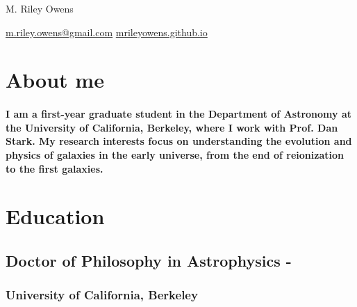 \documentclass[11pt]{article}
\newif\ifRemVS %
\newcommand{\rvs}{
    \ifRemVS
        \vspace{-1.5ex}
    \fi
    \global\RemVSfalse
}
\begin{document}
\begin{center}      
    {\fontsize{28}{28}\selectfont M. Riley Owens} \\ \bigskip

    {\color{icnclr}\faEnvelope[solid]} \href{mailto:m.riley.owens@gmail.com}{m.riley.owens@gmail.com} \quad
    {\color{icnclr}\faGlobe[regular]} \href{https://mrileyowens.github.io}{mrileyowens.github.io}
\end{center}

\section{About me}

\paragraph{
I am a first-year graduate student in the Department of Astronomy at the University of California, Berkeley, where I work with Prof. Dan Stark. My research interests focus on understanding the evolution and physics of galaxies in the early universe, from the end of reionization to the first galaxies.
}
\vspace{0.3cm}


\section{Education}

\subsection{Doctor of Philosophy in Astrophysics \hfill {}-}  
\subsubsection{University of California, Berkeley}
\vspace{0.1cm}
\end{document}
